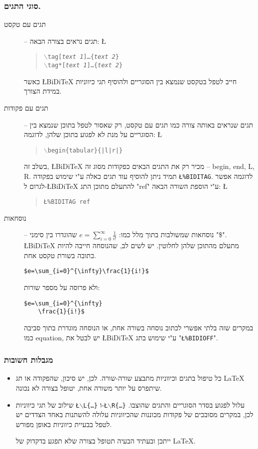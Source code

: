 \documentclass[twocolumn]{article}
\newcommand{\BiDiTeX}{\L{BiDi\TeX{}}}
\newcommand{\bs}{$\backslash$}
\newcommand{\tagL}{\texttt{\L{\bs L\{\ldots\}}}}
\newcommand{\tagR}{\texttt{\L{\bs R\{\ldots\}}}}
\newcommand{\bidioff}{\texttt{\L{\%BIDIOFF}}}
\newcommand{\biditag}{\texttt{\L{\%BIDITAG}}}
\newcommand{\code}[1]{\L{\begin{verse}\texttt{#1}\end{verse}}}
\begin{document}
\subsubsection{סוגי התגים.}
\begin{description}
\item[תגים עם טקסט] -- 
תגים נראים בצורה הבאה:
\code{\bs tag[\emph{text 1}]\ldots\{\emph{text 2}\}\\ \bs tag*[\emph{text 1}]\ldots\{\emph{text 2}\}}

כאשר \BiDiTeX{} חייב לטפל בטקסט שנמצא בין הסוגריים ולהוסיף תגי כיווניות במידת הצורך.
\item[תגים עם פקודות] --
תגים שנראים באותה צורה כמו תגים עם טקסט, רק שאסור לטפל בתוכן שנמצא בין הסוגריים על מנת לא לפגוע בתוכן שלהן, לדוגמה:
\code{\bs begin\{tabular\}\{|l|r|\}}
בשלב זה, \BiDiTeX{} מכיר רק את התגים הבאים כפקודות מסוג זה -- begin, end, L, R. תמיד ניתן להוסיף עוד תגים כאלה ע"י שימוש בפקודה \biditag. לדוגמה אפשר לגרום ל-\BiDiTeX{} להתעלם מתוכן התג "ref" ע"י הוספת השורה הבאה:
\code{\biditag{} ref}

\item[נוסחאות] --
נוסחאות שמשולבות בתוך מלל כמו: 
$e=\sum_{i=0}^{\infty}\frac{1}{i!}$
 שהוגדרו בין סימני "\$". \BiDiTeX{} מתעלם מהתוכן שלהן לחלוטין. יש לשים לב, שהנוסחה חייבה להיות כתובה בשורת טקסט אחת.

\unsethebrew
\verb+$e=\sum_{i=0}^{\infty}\frac{1}{i!}$+
\sethebrew

ולא פרוסה על מספר שורות:
\unsethebrew
\begin{verbatim}
$e=\sum_{i=0}^{\infty}
    \frac{1}{i!}$
\end{verbatim}
\sethebrew
במקרים שזה בלתי אפשרי לכתוב נוסחה בשורה אחת, או הנוסחה מוגדרת בתוך סביבה כמו equation, יש לבטל את \BiDiTeX{} ע"י שימוש בתג "\bidioff".
\end{description}
\subsubsection{מגבלות חשובות}
\begin{itemize}
\item
כל טיפול בתגים וכיווניות מתבצע שורה-שורה. לכן, יש סיכון, שהפקודה או תג \LaTeX{} שיתפרס על יותר משורה אחת, יטופל בצורה לא נכונה.
\item
שילוב של תגי כיווניות \tagL{} ו-\tagR{} עלול לפגוע בסדר הסוגריים והתגים שהוצבו. לכן, במקרים מסובכים של פקודות מכוננות שהכיווניות עלולה להשתנות באחד הצדדים יש לטפל בבעיית כיווניות באופן מפורש.

ייתכן ובעתיד הבעיה תטופל בצורה שלא תפגע בדקדוק של \LaTeX.


\end{itemize}
\end{document}

